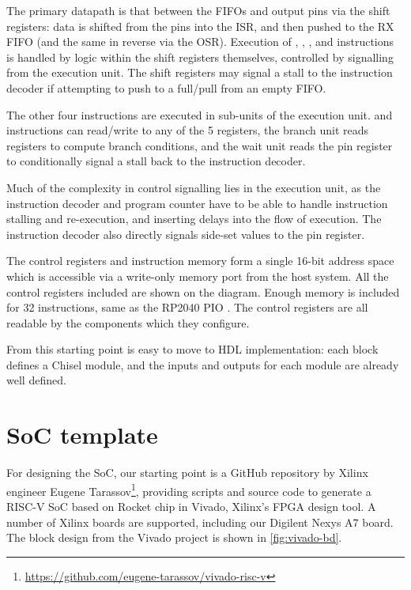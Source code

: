 The primary datapath is that between the FIFOs and output pins via the shift registers: data is shifted from the pins into the ISR, and then pushed to the RX FIFO (and the same in reverse via the OSR). Execution of , , , and  instructions is handled by logic within the shift registers themselves, controlled by signalling from the execution unit. The shift registers may signal a stall to the instruction decoder if attempting to push to a full/pull from an empty FIFO.

The other four instructions are executed in sub-units of the execution unit.  and  instructions can read/write to any of the 5 registers, the branch unit reads registers to compute branch conditions, and the wait unit reads the pin register to conditionally signal a stall back to the instruction decoder.

Much of the complexity in control signalling lies in the execution unit, as the instruction decoder and program counter have to be able to handle instruction stalling and re-execution, and inserting delays into the flow of execution. The instruction decoder also directly signals side-set values to the pin register.

The control registers and instruction memory form a single 16-bit address space which is accessible via a write-only memory port from the host system. All the control registers included are shown on the diagram. Enough memory is included for 32 instructions, same as the RP2040 PIO \cite{rp2040}. The control registers are all readable by the components which they configure.

From this starting point is easy to move to HDL implementation: each block defines a Chisel module, and the inputs and outputs for each module are already well defined.

\section{SoC template}

For designing the SoC, our starting point is a GitHub repository by Xilinx  engineer Eugene Tarassov\footnote{\url{https://github.com/eugene-tarassov/vivado-risc-v}}, providing scripts and source code to generate a RISC-V SoC based on Rocket chip in Vivado, Xilinx's FPGA design tool. A number of Xilinx boards are supported, including our Digilent Nexys A7 board. The block design from the Vivado project is shown in  \ref{fig:vivado-bd}.


